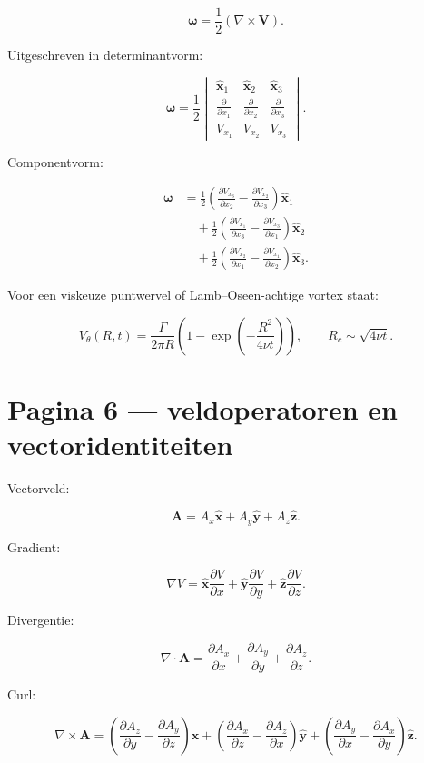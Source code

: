 \documentclass[11pt,a4paper]{article}
\newcommand{\vect}[1]{\mathbf{#1}}
\begin{document}
$$
\bm{\omega}
=
\frac{1}{2}\left(\nabla\times\vect{V}\right).
$$

Uitgeschreven in determinantvorm:

$$
\bm{\omega}
=
\frac{1}{2}
\begin{vmatrix}
\hat{\vect{x}}_1 & \hat{\vect{x}}_2 & \hat{\vect{x}}_3\\
\frac{\partial}{\partial x_1} & \frac{\partial}{\partial x_2} & \frac{\partial}{\partial x_3}\\
V_{x_1} & V_{x_2} & V_{x_3}
\end{vmatrix}.
$$

Componentvorm:

$$
\begin{aligned}
\bm{\omega}
&=
\frac{1}{2}
\left(\frac{\partial V_{x_3}}{\partial x_2}
      -\frac{\partial V_{x_2}}{\partial x_3}\right)\hat{\vect{x}}_1\\
&\quad+
\frac{1}{2}
\left(\frac{\partial V_{x_1}}{\partial x_3}
      -\frac{\partial V_{x_3}}{\partial x_1}\right)\hat{\vect{x}}_2\\
&\quad+
\frac{1}{2}
\left(\frac{\partial V_{x_2}}{\partial x_1}
      -\frac{\partial V_{x_1}}{\partial x_2}\right)\hat{\vect{x}}_3.
\end{aligned}
$$

Voor een viskeuze puntwervel of Lamb--Oseen-achtige vortex staat:

$$
V_\theta(R,t)
=
\frac{\Gamma}{2\pi R}
\left(
1-\exp\left(-\frac{R^2}{4\nu t}\right)
\right),
\qquad
R_c\sim\sqrt{4\nu t}.
$$

\newpage

\section*{Pagina 6 --- veldoperatoren en vectoridentiteiten}
Vectorveld:

$$
\vect{A}
=
A_x\hat{\vect{x}}
+
A_y\hat{\vect{y}}
+
A_z\hat{\vect{z}}.
$$

Gradient:

$$
\nabla V
=
\hat{\vect{x}}\frac{\partial V}{\partial x}
+
\hat{\vect{y}}\frac{\partial V}{\partial y}
+
\hat{\vect{z}}\frac{\partial V}{\partial z}.
$$

Divergentie:

$$
\nabla\cdot\vect{A}
=
\frac{\partial A_x}{\partial x}
+
\frac{\partial A_y}{\partial y}
+
\frac{\partial A_z}{\partial z}.
$$

Curl:

$$
\nabla\times\vect{A}
=
\left(\frac{\partial A_z}{\partial y}-\frac{\partial A_y}{\partial z}\right)\hat{\vect{x}}
+
\left(\frac{\partial A_x}{\partial z}-\frac{\partial A_z}{\partial x}\right)\hat{\vect{y}}
+
\left(\frac{\partial A_y}{\partial x}-\frac{\partial A_x}{\partial y}\right)\hat{\vect{z}}.
$$
\end{document}
